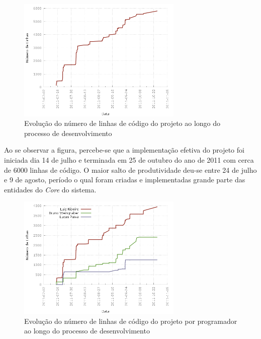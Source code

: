\begin{figure}[!htb]
	\centering
	\includegraphics[width=0.7\textwidth]{./plots/lines_of_code.png}
	\caption[Evolução do número de linhas de código do projeto]{Evolução do número de linhas de código do projeto ao longo do processo de desenvolvimento}
	\label{fig:linesofcode}
\end{figure}

Ao se observar a figura, percebe-se que a implementação efetiva do projeto foi iniciada dia 14 de julho e terminada em 25 de outubro do ano de 2011 com cerca de 6000 linhas de código. O maior salto de produtividade deu-se entre 24 de julho e 9 de agosto, período o qual foram criadas e implementadas grande parte das entidades do \emph{Core} do sistema. 

\begin{figure}[!htb]
	\centering
	\includegraphics[width=0.7\textwidth]{./plots/lines_of_code_by_author.png}
	\caption[Evolução do número de linhas de código por programador]{Evolução do número de linhas de código do projeto por programador ao longo do processo de desenvolvimento}
	\label{fig:linesofcodebyauthor}
\end{figure}

